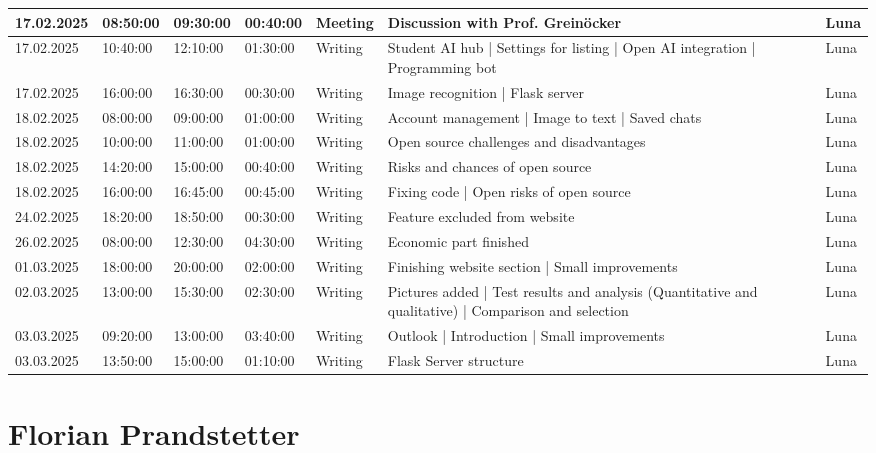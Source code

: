 \begin{longtable}{@{}p{1.8cm} p{1.2cm} p{1.2cm} p{1.2cm} p{2cm} p{4.5cm} p{2cm}@{}}
17.02.2025 & 08:50:00 & 09:30:00 & 00:40:00 & Meeting & Discussion with Prof. Greinöcker & Luna \\
\hline
17.02.2025 & 10:40:00 & 12:10:00 & 01:30:00 & Writing & Student AI hub | Settings for listing | Open AI integration | Programming bot & Luna \\
\hline
17.02.2025 & 16:00:00 & 16:30:00 & 00:30:00 & Writing & Image recognition | Flask server & Luna \\
\hline
18.02.2025 & 08:00:00 & 09:00:00 & 01:00:00 & Writing & Account management | Image to text | Saved chats & Luna \\
\hline
18.02.2025 & 10:00:00 & 11:00:00 & 01:00:00 & Writing & Open source challenges and disadvantages & Luna \\
\hline
18.02.2025 & 14:20:00 & 15:00:00 & 00:40:00 & Writing & Risks and chances of open source & Luna \\
\hline
18.02.2025 & 16:00:00 & 16:45:00 & 00:45:00 & Writing & Fixing code | Open risks of open source & Luna \\
\hline
24.02.2025 & 18:20:00 & 18:50:00 & 00:30:00 & Writing & Feature excluded from website & Luna \\
\hline
26.02.2025 & 08:00:00 & 12:30:00 & 04:30:00 & Writing & Economic part finished & Luna \\
\hline
01.03.2025 & 18:00:00 & 20:00:00 & 02:00:00 & Writing & Finishing website section | Small improvements & Luna \\
\hline
02.03.2025 & 13:00:00 & 15:30:00 & 02:30:00 & Writing & Pictures added | Test results and analysis (Quantitative and qualitative) | Comparison and selection & Luna \\
\hline
03.03.2025 & 09:20:00 & 13:00:00 & 03:40:00 & Writing & Outlook | Introduction | Small improvements & Luna \\
\hline
03.03.2025 & 13:50:00 & 15:00:00 & 01:10:00 & Writing & Flask Server structure & Luna \\
\hline

\end{longtable}



\section{Florian Prandstetter}

